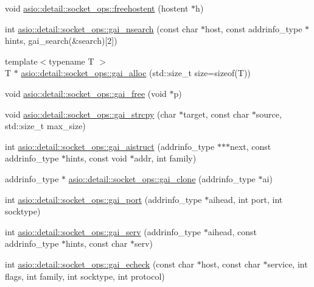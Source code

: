 \begin{DoxyCompactItemize}
\item 
void \hyperlink{namespaceasio_1_1detail_1_1socket__ops_a4742183093a78dc64b5730317431c982}{asio\+::detail\+::socket\+\_\+ops\+::freehostent} (hostent $\ast$h)
\item 
int \hyperlink{namespaceasio_1_1detail_1_1socket__ops_acfadaf1e44302b8a7fedfc4d8e913df5}{asio\+::detail\+::socket\+\_\+ops\+::gai\+\_\+nsearch} (const char $\ast$host, const addrinfo\+\_\+type $\ast$hints, gai\+\_\+search(\&search)\mbox{[}2\mbox{]})
\item 
{\footnotesize template$<$typename T $>$ }\\T $\ast$ \hyperlink{namespaceasio_1_1detail_1_1socket__ops_af238a1f30ef5ba5c16712a3a6007fddf}{asio\+::detail\+::socket\+\_\+ops\+::gai\+\_\+alloc} (std\+::size\+\_\+t size=sizeof(T))
\item 
void \hyperlink{namespaceasio_1_1detail_1_1socket__ops_ae39ce1a42481185858ab8f176f0ee276}{asio\+::detail\+::socket\+\_\+ops\+::gai\+\_\+free} (void $\ast$p)
\item 
void \hyperlink{namespaceasio_1_1detail_1_1socket__ops_aa070cff3d85c8ce580cc05e47324c40c}{asio\+::detail\+::socket\+\_\+ops\+::gai\+\_\+strcpy} (char $\ast$target, const char $\ast$source, std\+::size\+\_\+t max\+\_\+size)
\item 
int \hyperlink{namespaceasio_1_1detail_1_1socket__ops_a982e3e98590c8d3712681b8994b4548a}{asio\+::detail\+::socket\+\_\+ops\+::gai\+\_\+aistruct} (addrinfo\+\_\+type $\ast$$\ast$$\ast$next, const addrinfo\+\_\+type $\ast$hints, const void $\ast$addr, int family)
\item 
addrinfo\+\_\+type $\ast$ \hyperlink{namespaceasio_1_1detail_1_1socket__ops_a9bc45b81d40d42cfcbbd3fd74e3c29eb}{asio\+::detail\+::socket\+\_\+ops\+::gai\+\_\+clone} (addrinfo\+\_\+type $\ast$ai)
\item 
int \hyperlink{namespaceasio_1_1detail_1_1socket__ops_a0f1604f37200bb870157f5294087dbf8}{asio\+::detail\+::socket\+\_\+ops\+::gai\+\_\+port} (addrinfo\+\_\+type $\ast$aihead, int port, int socktype)
\item 
int \hyperlink{namespaceasio_1_1detail_1_1socket__ops_ab8abd7ae55fffb703e61cb0ab5aabfd3}{asio\+::detail\+::socket\+\_\+ops\+::gai\+\_\+serv} (addrinfo\+\_\+type $\ast$aihead, const addrinfo\+\_\+type $\ast$hints, const char $\ast$serv)
\item 
int \hyperlink{namespaceasio_1_1detail_1_1socket__ops_acbcfd09ff025b1cc00945ef4c61770c6}{asio\+::detail\+::socket\+\_\+ops\+::gai\+\_\+echeck} (const char $\ast$host, const char $\ast$service, int flags, int family, int socktype, int protocol)

\end{DoxyCompactItemize}
